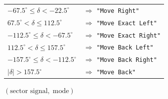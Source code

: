 \documentclass[12pt]{report}
\begin{document}
{\begin{algorithm}[H]
\begin{tabular}{@{}ll@{}}
$-67.5^{\circ} \le \delta < -22.5^{\circ}$       & $\Rightarrow$ \texttt{"Move Right"} \\
$67.5^{\circ} < \delta \le 112.5^{\circ}$        & $\Rightarrow$ \texttt{"Move Exact Left"} \\
$-112.5^{\circ} \le \delta < -67.5^{\circ}$      & $\Rightarrow$ \texttt{"Move Exact Right"} \\
$112.5^{\circ} < \delta \le 157.5^{\circ}$       & $\Rightarrow$ \texttt{"Move Back Left"} \\
$-157.5^{\circ} \le \delta < -112.5^{\circ}$     & $\Rightarrow$ \texttt{"Move Back Right"} \\
$|\delta| > 157.5^{\circ}$                       & $\Rightarrow$ \texttt{"Move Back"} \\
\end{tabular}
\BlankLine
\Return $(\text{sector signal},\;\mathrm{mode})$\;
\end{algorithm}
}
\end{document}
